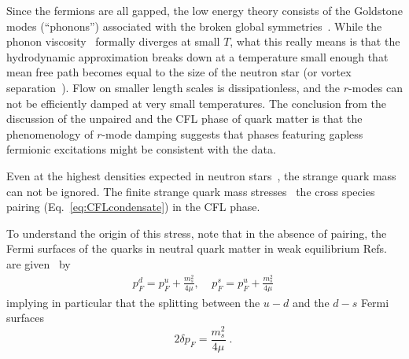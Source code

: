 \documentclass[10pt, aps, prd, superscriptaddress, nofootinbib, 
               amsmath, amssymb, twocolumn,
               preprintnumbers, showpacs,
               raggedbottom,
               floatfix]{revtex4-1}
\begin{document}
Since the fermions are all gapped, the low energy theory consists of the
Goldstone modes (``phonons'') associated with the broken global
symmetries~\cite{Alford:1998mk,Son:1999cm,Son:2000tu,Casalbuoni:1999zi,Rho:1999xf,Hong:1999ei,Manuel:2000wm,Rho:2000ww}.
While the phonon viscosity~\cite{Manuel:2004iv} formally diverges at small $T$,
what this really means is that the hydrodynamic approximation breaks down at a
temperature small enough that mean free path becomes equal to the size of the
neutron star (or vortex separation~\cite{Mannarelli:2008je}). Flow on smaller
length scales is dissipationless, and the $r$-modes can not be efficiently damped at very
small temperatures.  The conclusion from the discussion of the unpaired and the
CFL phase of quark matter is that the phenomenology of $r$-mode damping
suggests that phases featuring gapless fermionic excitations might be
consistent with the data.

Even at the highest densities expected in neutron stars~\cite{page2006dense},
the strange quark mass can not be ignored. The finite strange quark mass
stresses~\cite{Rajagopal:2005dg} the cross species pairing
(Eq.~\ref{eq:CFLcondensate}) in the CFL phase. 

To understand the origin of this stress, note that in the absence of pairing,
the Fermi surfaces of the quarks in neutral quark matter in weak equilibrium
Refs.~\cite{Alford:1999pa,Alford:2000ze} are given~\cite{Bowers:2003ye} by
\begin{equation}
\begin{split}
p_F^d = p_F^u + \frac{m_s^2}{4\mu},\;\;\;\;
p_F^s = p_F^u + \frac{m_s^2}{4\mu} ~\label{eq:pFs}
\end{split}
\end{equation}
implying in particular that the splitting between the $u-d$ and the $d-s$ Fermi 
surfaces 
\begin{equation}
2\delta p_F=\frac{m_s^2}{4\mu}\;.~\label{eq:dmu}
\end{equation}
\end{document}
